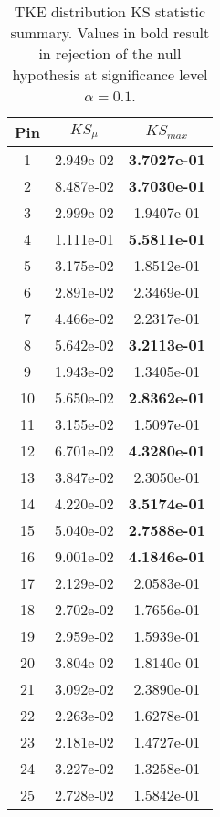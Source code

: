 \begin{table}[h]
    \begin{center}
    \caption[KS statistic TKE summary.]{TKE distribution KS statistic summary. Values in bold result in rejection of the null hypothesis at significance level $\alpha=0.1$.}
    \begin{tabular}[h]{|c|c|c|}
        \hline
        Pin & $KS_\mu$ & $KS_{max}$ \\
\hline
1 &  2.949e-02 &  \textbf{3.7027e-01} \\
2 &  8.487e-02 &  \textbf{3.7030e-01} \\
3 &  2.999e-02 &  1.9407e-01 \\
4 &  1.111e-01 &  \textbf{5.5811e-01} \\
5 &  3.175e-02 &  1.8512e-01 \\
6 &  2.891e-02 &  2.3469e-01 \\
7 &  4.466e-02 &  2.2317e-01 \\
8 &  5.642e-02 &  \textbf{3.2113e-01} \\
9 &  1.943e-02 &  1.3405e-01 \\
10 & 5.650e-02 & \textbf{2.8362e-01} \\
11 & 3.155e-02 & 1.5097e-01 \\
12 & 6.701e-02 & \textbf{4.3280e-01} \\
13 & 3.847e-02 & 2.3050e-01 \\
14 & 4.220e-02 & \textbf{3.5174e-01} \\
15 & 5.040e-02 & \textbf{2.7588e-01} \\
16 & 9.001e-02 & \textbf{4.1846e-01} \\
17 & 2.129e-02 & 2.0583e-01 \\
18 & 2.702e-02 & 1.7656e-01 \\
19 & 2.959e-02 & 1.5939e-01 \\
20 & 3.804e-02 & 1.8140e-01 \\
21 & 3.092e-02 & 2.3890e-01 \\
22 & 2.263e-02 & 1.6278e-01 \\
23 & 2.181e-02 & 1.4727e-01 \\
24 & 3.227e-02 & 1.3258e-01 \\
25 & 2.728e-02 & 1.5842e-01 \\
\hline
\end{tabular}
\label{tab:ks_tke}
\end{center}
\end{table}


